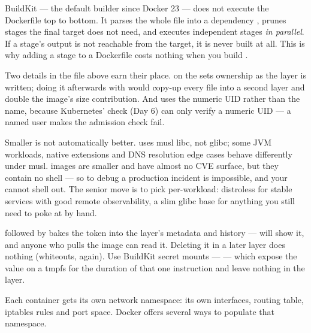  BuildKit --- the default builder since Docker 23 --- does not execute the Dockerfile top to bottom. It parses the whole file into a dependency , prunes stages the final target does not need, and executes independent stages \emph{in parallel}. If a stage's output is not reachable from the target, it is never built at all. This is why adding a  stage to a Dockerfile costs nothing when you build .

Two details in the file above earn their place.  on the  sets ownership as the layer is written; doing it afterwards with  would copy-up every file into a second layer and double the image's size contribution. And  uses the numeric UID rather than the name, because Kubernetes'  check (Day 6) can only verify a numeric UID --- a named user makes the admission check fail.

\begin{tradeoff}
Smaller is not automatically better.  uses musl libc, not glibc; some JVM workloads, native extensions and DNS resolution edge cases behave differently under musl.  images are smaller and have almost no CVE surface, but they contain no shell --- so  to debug a production incident is impossible, and your  cannot shell out. The senior move is to pick per-workload: distroless for stable services with good remote observability, a slim glibc base for anything you still need to poke at by hand.
\end{tradeoff}

\begin{secwarn}
 followed by  bakes the token into the layer's metadata and history ---  will show it, and anyone who pulls the image can read it. Deleting it in a later layer does nothing (whiteouts, again). Use BuildKit secret mounts ---  --- which expose the value on a tmpfs for the duration of that one instruction and leave nothing in the layer.
\end{secwarn}


 Each container gets its own network namespace: its own interfaces, routing table, iptables rules and port space. Docker offers several ways to populate that namespace.

